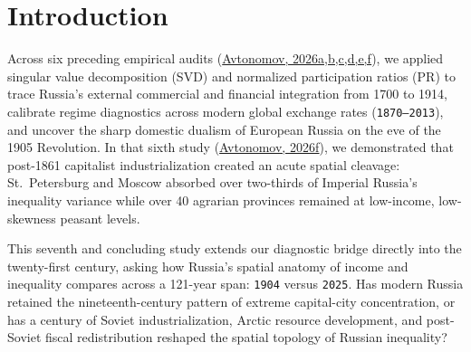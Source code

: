 \documentclass[11pt,a4paper]{article}
\begin{document}
\section{Introduction}

Across six preceding empirical audits (\href{https://doi.org}{Avtonomov, 2026a,b,c,d,e,f}), we applied singular value decomposition (SVD) and normalized participation ratios ($\mathrm{PR}$) to trace Russia's external commercial and financial integration from 1700 to 1914, calibrate regime diagnostics across modern global exchange rates (\texttt{1870--2013}), and uncover the sharp domestic dualism of European Russia on the eve of the 1905 Revolution. In that sixth study (\href{https://doi.org}{Avtonomov, 2026f}), we demonstrated that post-1861 capitalist industrialization created an acute spatial cleavage: St.~Petersburg and Moscow absorbed over two-thirds of Imperial Russia's inequality variance while over 40 agrarian provinces remained at low-income, low-skewness peasant levels.

This seventh and concluding study extends our diagnostic bridge directly into the twenty-first century, asking how Russia's spatial anatomy of income and inequality compares across a 121-year span: \texttt{1904} versus \texttt{2025}. Has modern Russia retained the nineteenth-century pattern of extreme capital-city concentration, or has a century of Soviet industrialization, Arctic resource development, and post-Soviet fiscal redistribution reshaped the spatial topology of Russian inequality?
\end{document}
